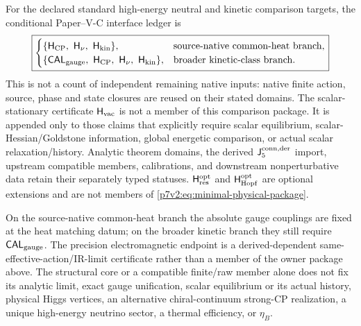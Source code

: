 \documentclass[11pt,a4paper]{article}
\newcommand{\Hkin}{\mathsf{H}_{\rm kin}}
\newcommand{\Hvac}{\mathsf{H}_{\rm vac}}
\newcommand{\Hcp}{\mathsf{H}_{\rm CP}}
\newcommand{\Hnu}{\mathsf{H}_{\nu}}
\newcommand{\Rconn}{\mathsf J_5^{\rm conn,der}}
\newcommand{\CALgauge}{\mathsf{CAL}_{\rm gauge}}
\newcommand{\Hresopt}{\mathsf H_{\rm res}^{\rm opt}}
\newcommand{\Hhopfopt}{\mathsf H_{\rm Hopf}^{\rm opt}}
\begin{document}
\begin{theorem}
For the declared standard high-energy neutral and kinetic comparison targets,
the conditional Paper--V-C interface ledger is
\begin{equation}
\label{p7v2:eq:minimal-physical-package}
\boxed{
\begin{cases}
\{\Hcp,\ \Hnu,\ \Hkin\},
& \text{source-native common-heat branch},\\
\{\CALgauge,\ \Hcp,\ \Hnu,\ \Hkin\},
& \text{broader kinetic-class branch}.
\end{cases}
}
\end{equation}
This is not a count of independent remaining native inputs: native finite
action, source, phase and state closures are reused on their stated domains.
The scalar-stationary certificate \(\Hvac\) is not a member of this comparison
package.  It is appended only to those claims that explicitly require scalar
equilibrium, scalar-Hessian/Goldstone information, global energetic comparison,
or actual scalar relaxation/history.  Analytic theorem domains, the derived
\(\Rconn\) import, upstream compatible members, calibrations, and downstream
nonperturbative data retain their separately typed statuses.  \(\Hresopt\) and
\(\Hhopfopt\) are optional extensions and are not members of
\eqref{p7v2:eq:minimal-physical-package}.

On the source-native common-heat branch the absolute gauge couplings are fixed
at the heat matching datum; on the broader kinetic branch they still require
\(\CALgauge\).  The precision electromagnetic endpoint is a derived-dependent
same-effective-action/IR-limit certificate rather than a member of the owner
package above.  The structural core or a compatible finite/raw member alone
does not fix its analytic limit, exact gauge unification, scalar equilibrium
or its actual history, physical Higgs vertices, an alternative chiral-continuum
strong-CP realization, a unique
high-energy neutrino sector, a thermal efficiency, or \(\eta_B\).
\end{theorem}
\end{document}
